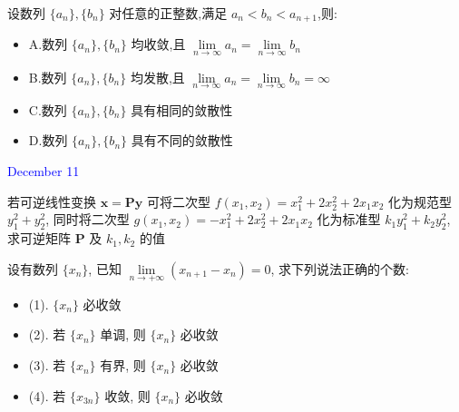 \begin{solution}
	
\end{solution}

\begin{example}[][Exam: 38.2.6]
	设数列 $\{a_{n}\},\{b_{n}\}$ 对任意的正整数,满足 $a_{n}<b_{n}<a_{n+1}$,则:
	\begin{itemize}
		\item A.数列 $\{a_{n}\},\{b_{n}\}$ 均收敛,且 $\lim\limits_{n\to  \infty}a_{n}=\lim\limits_{n\to \infty}b_{n}$
		\item B.数列 $\{a_{n}\},\{b_{n}\}$ 均发散,且 $\lim\limits_{n\to  \infty}a_{n}=\lim\limits_{n\to \infty}b_{n}=\infty$
		\item C.数列 $\{a_{n}\},\{b_{n}\}$ 具有相同的敛散性
		\item D.数列 $\{a_{n}\},\{b_{n}\}$ 具有不同的敛散性
	\end{itemize}
\end{example}

\begin{solution}
	
\end{solution}


\textcolor{blue}{December 11}

\begin{example}[][Exam: 38.2.7]
	若可逆线性变换 $\mathbf{x=Py}$ 可将二次型 $f(x_{1}, x_{2})=x_{1}^{2}+2x_{2}^{2}+2x_{1}x_{2}$ 化为规范型 $y_{1}^{2}+y_{2}^{2}$,
	同时将二次型 $g(x_{1},x_{2})=-x_{1}^{2}+2x_{2}^{2}+2x_{1}x_{2}$ 化为标准型 $k_{1}y_{1}^{2}+k_{2}y_{2}^{2}$, 
	求可逆矩阵 $\mathbf{P}$ 及 $k_{1},k_{2}$ 的值
\end{example}

\begin{solution}
	
\end{solution}

\begin{example}[][Exam: 38.2.8]
	设有数列 $\{x_{n}\}$, 已知 $\lim\limits_{n\to +\infty}(x_{n+1}-x_{n})=0$, 求下列说法正确的个数:
\begin{itemize}
	\item (1). $\{x_{n}\}$ 必收敛
	\item (2). 若 $\{x_{n}\}$ 单调, 则 $\{x_{n}\}$ 必收敛
	\item (3). 若 $\{x_{n}\}$ 有界, 则 $\{x_{n}\}$ 必收敛
	\item (4). 若 $\{x_{3n}\}$ 收敛, 则 $\{x_{n}\}$ 必收敛
\end{itemize}
\end{example}

